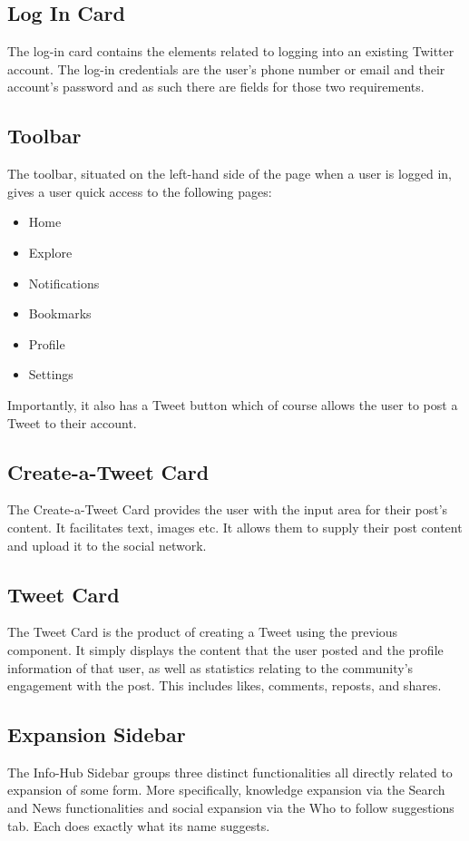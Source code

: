 \documentclass{article}
\begin{document}
\subsection{Log In Card}
The log-in card contains the elements related to logging into an existing Twitter account. The log-in credentials are the user’s phone number or email and their account’s password and as such there are fields for those two requirements.

\subsection{Toolbar}
The toolbar, situated on the left-hand side of the page when a user is logged in, gives a user quick access to the following pages:
\begin{itemize}
    \item Home
    \item Explore
    \item Notifications
    \item Bookmarks
    \item Profile
    \item Settings
\end{itemize}
Importantly, it also has a Tweet button which of course allows the user to post a Tweet to their account.

\subsection{Create-a-Tweet Card}
The Create-a-Tweet Card provides the user with the input area for their post’s content. It facilitates text, images etc. It allows them to supply their post content and upload it to the social network. 

\subsection{Tweet Card}
The Tweet Card is the product of creating a Tweet using the previous component. It simply displays the content that the user posted and the profile information of that user, as well as statistics relating to the community’s engagement with the post. This includes likes, comments, reposts, and shares.

\subsection{Expansion Sidebar}
The Info-Hub Sidebar groups three distinct functionalities all directly related to expansion of some form. More specifically, knowledge expansion via the Search and News functionalities and social expansion via the Who to follow suggestions tab. Each does exactly what its name suggests. 
\end{document}

